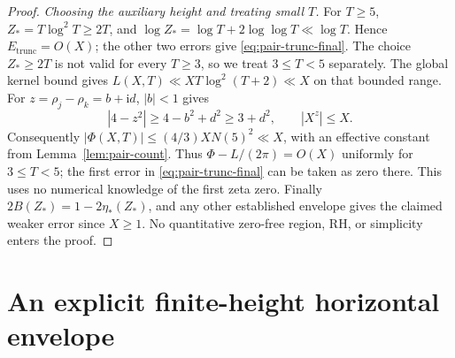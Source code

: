 \documentclass[11pt]{article}
\newcommand{\ii}{\mathrm i}
\newcommand{\ELtr}{E_{\mathrm{trunc}}}
\begin{document}
\begin{proof}
\textit{Choosing the auxiliary height and treating small \(T\).}
For \(T\geq5\), \(Z_*=T\log^2T\geq2T\), and
\(\log Z_*=\log T+2\log\log T\ll\log T\).
Hence \(\ELtr=O(X)\); the other two errors give
\eqref{eq:pair-trunc-final}. The choice \(Z_*\geq2T\) is not
valid for every \(T\geq3\), so we treat \(3\leq T<5\) separately.
The global kernel bound gives
\(L(X,T)\ll XT\log^2(T+2)\ll X\) on that bounded range.
For \(z=\rho_j-\rho_k=b+\ii d\), \(|b|<1\) gives
\[
 |4-z^2|\geq4-b^2+d^2\geq3+d^2,\qquad
 |X^z|\leq X.
\]
Consequently \(|\Phi(X,T)|\leq(4/3)XN(5)^2\ll X\), with an
effective constant from Lemma~\ref{lem:pair-count}.
Thus \(\Phi-L/(2\pi)=O(X)\) uniformly for \(3\leq T<5\);
the first error in \eqref{eq:pair-trunc-final} can be taken as zero
there. This uses no numerical knowledge of the first zeta zero.
Finally \(2B(Z_*)=1-2\eta_*(Z_*)\), and any other established
envelope gives the claimed weaker error since \(X\geq1\).
No quantitative zero-free region, RH, or simplicity enters the proof.
\end{proof}

\section{An explicit finite-height horizontal envelope}
\end{document}
